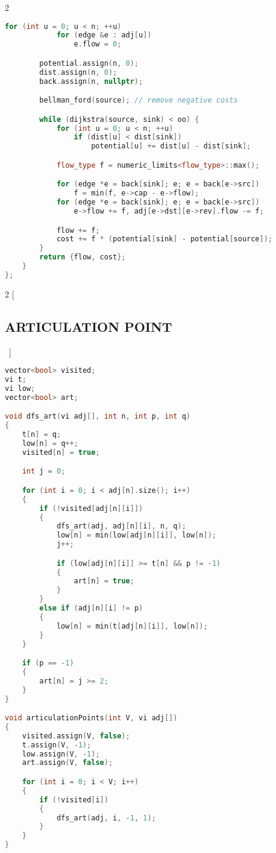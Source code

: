 \documentclass[leter]{amsart}
\begin{document}
\begin{multicols}{2}
\begin{lstlisting}[language=C++]
		for (int u = 0; u < n; ++u)
			for (edge &e : adj[u])
				e.flow = 0;

		potential.assign(n, 0);
		dist.assign(n, 0);
		back.assign(n, nullptr);

		bellman_ford(source); // remove negative costs

		while (dijkstra(source, sink) < oo) {
			for (int u = 0; u < n; ++u)
				if (dist[u] < dist[sink])
					potential[u] += dist[u] - dist[sink];

			flow_type f = numeric_limits<flow_type>::max();

			for (edge *e = back[sink]; e; e = back[e->src])
				f = min(f, e->cap - e->flow);
			for (edge *e = back[sink]; e; e = back[e->src])
				e->flow += f, adj[e->dst][e->rev].flow -= f;

			flow += f;
			cost += f * (potential[sink] - potential[source]);
		}
		return {flow, cost};
	}
};


\end{lstlisting}
\end{multicols}
\begin{multicols}{2}
[\subsection{ARTICULATION POINT}\ ]
\begin{lstlisting}[language=C++]
vector<bool> visited;
vi t;
vi low;
vector<bool> art;

void dfs_art(vi adj[], int n, int p, int q)
{
    t[n] = q;
    low[n] = q++;
    visited[n] = true;

    int j = 0;

    for (int i = 0; i < adj[n].size(); i++)
    {
        if (!visited[adj[n][i]])
        {
            dfs_art(adj, adj[n][i], n, q);
            low[n] = min(low[adj[n][i]], low[n]);
            j++;

            if (low[adj[n][i]] >= t[n] && p != -1)
            {
                art[n] = true;
            }
        }
        else if (adj[n][i] != p)
        {
            low[n] = min(t[adj[n][i]], low[n]);
        }
    }

    if (p == -1)
    {
        art[n] = j >= 2;
    }
}

void articulationPoints(int V, vi adj[])
{
    visited.assign(V, false);
    t.assign(V, -1);
    low.assign(V, -1);
    art.assign(V, false);

    for (int i = 0; i < V; i++)
    {
        if (!visited[i])
        {
            dfs_art(adj, i, -1, 1);
        }
    }
}


\end{lstlisting}
\end{multicols}
\end{document}
